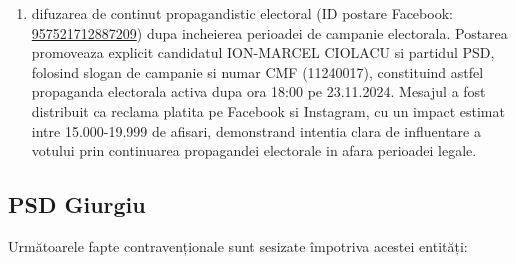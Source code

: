 \documentclass[a4paper,12pt]{article}
\begin{document}
\begin{enumerate}[leftmargin=*, label=\arabic*.)]
    \item difuzarea de continut propagandistic electoral (ID postare Facebook: \href{https://www.facebook.com/ads/library/?id=957521712887209}{957521712887209}) dupa incheierea perioadei de campanie electorala. Postarea promoveaza explicit candidatul ION-MARCEL CIOLACU si partidul PSD, folosind slogan de campanie si numar CMF (11240017), constituind astfel propaganda electorala activa dupa ora 18:00 pe 23.11.2024. Mesajul a fost distribuit ca reclama platita pe Facebook si Instagram, cu un impact estimat intre 15.000-19.999 de afisari, demonstrand intentia clara de influentare a votului prin continuarea propagandei electorale in afara perioadei legale.
\end{enumerate}

\vspace{0.5cm}

\subsection{PSD Giurgiu}
Următoarele fapte contravenționale sunt sesizate împotriva acestei entități:
\end{document}
